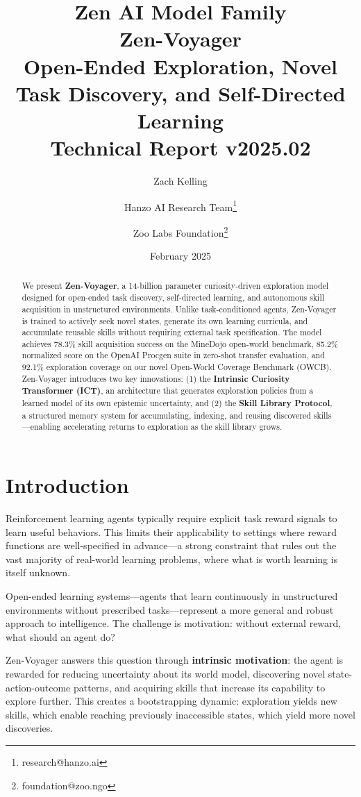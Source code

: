 \documentclass[11pt,a4paper]{article}
\title{
    \vspace{-2cm}
    \Large \textbf{Zen AI Model Family} \\
    \vspace{0.5cm}
    \Huge \textbf{Zen-Voyager} \\
    \vspace{0.3cm}
    \large Open-Ended Exploration, Novel Task Discovery, and Self-Directed Learning \\
    \vspace{0.5cm}
    \normalsize Technical Report v2025.02
}
\author{
    Zach Kelling \and Hanzo AI Research Team\thanks{research@hanzo.ai} \and
    Zoo Labs Foundation\thanks{foundation@zoo.ngo}
}
\date{February 2025}
\begin{document}
\maketitle

\begin{abstract}
We present \textbf{Zen-Voyager}, a 14-billion parameter curiosity-driven exploration model
designed for open-ended task discovery, self-directed learning, and autonomous skill acquisition
in unstructured environments. Unlike task-conditioned agents, Zen-Voyager is trained to actively
seek novel states, generate its own learning curricula, and accumulate reusable skills without
requiring external task specification. The model achieves 78.3\% skill acquisition success on
the MineDojo open-world benchmark, 85.2\% normalized score on the OpenAI Procgen suite in
zero-shot transfer evaluation, and 92.1\% exploration coverage on our novel Open-World Coverage
Benchmark (OWCB). Zen-Voyager introduces two key innovations: (1) the \textbf{Intrinsic
Curiosity Transformer (ICT)}, an architecture that generates exploration policies from a
learned model of its own epistemic uncertainty, and (2) the \textbf{Skill Library Protocol},
a structured memory system for accumulating, indexing, and reusing discovered skills---enabling
accelerating returns to exploration as the skill library grows.
\end{abstract}

\tableofcontents
\newpage

\section{Introduction}

Reinforcement learning agents typically require explicit task reward signals to learn useful
behaviors. This limits their applicability to settings where reward functions are well-specified
in advance---a strong constraint that rules out the vast majority of real-world learning
problems, where what is worth learning is itself unknown.

Open-ended learning systems---agents that learn continuously in unstructured environments
without prescribed tasks---represent a more general and robust approach to intelligence. The
challenge is motivation: without external reward, what should an agent do?

Zen-Voyager answers this question through \textbf{intrinsic motivation}: the agent is rewarded
for reducing uncertainty about its world model, discovering novel state-action-outcome patterns,
and acquiring skills that increase its capability to explore further. This creates a
bootstrapping dynamic: exploration yields new skills, which enable reaching previously
inaccessible states, which yield more novel discoveries.
\end{document}
